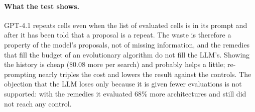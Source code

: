 \documentclass[preprint,12pt,authoryear]{elsarticle}
\begin{document}
\paragraph{What the test shows.} GPT-4.1 repeats cells even when the list of evaluated cells is in its prompt and after it has been told that a proposal is a repeat. The waste is therefore a property of the model's proposals, not of missing information, and the remedies that fill the budget of an evolutionary algorithm do not fill the LLM's. Showing the history is cheap (\$0.08 more per search) and probably helps a little; re-prompting nearly triples the cost and lowers the result against the controls. The objection that the LLM loses only because it is given fewer evaluations is not supported: with the remedies it evaluated 68\% more architectures and still did not reach any control.
\end{document}
